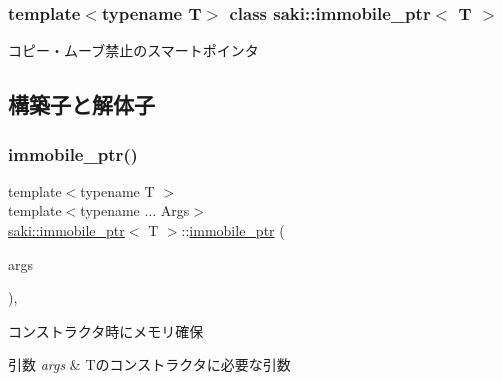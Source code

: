 \subsubsection*{template$<$typename T$>$\newline
class saki\+::immobile\+\_\+ptr$<$ T $>$}

コピー・ムーブ禁止のスマートポインタ 

\subsection{構築子と解体子}
\mbox{\label{classsaki_1_1immobile__ptr_aa64c721ab505396e3b7b75bb6916b562}} 
\subsubsection{\texorpdfstring{immobile\+\_\+ptr()}{immobile\_ptr()}\hspace{0.1cm}{\footnotesize\ttfamily [1/3]}}
{\footnotesize\ttfamily template$<$typename T $>$ \\
template$<$typename ... Args$>$ \\
\mbox{\hyperlink{classsaki_1_1immobile__ptr}{saki\+::immobile\+\_\+ptr}}$<$ T $>$\+::\mbox{\hyperlink{classsaki_1_1immobile__ptr}{immobile\+\_\+ptr}} (\begin{DoxyParamCaption}\item[{Args...}]{args }\end{DoxyParamCaption})\hspace{0.3cm}{\ttfamily [inline]}, {\ttfamily [explicit]}}



コンストラクタ時にメモリ確保 


\begin{DoxyParams}{引数}
{\em args} & Tのコンストラクタに必要な引数 \\
\hline
\end{DoxyParams}
\mbox{\label{classsaki_1_1immobile__ptr_a7cb3ccfa2a366adfe164a0ba6c0f86d6}} 
